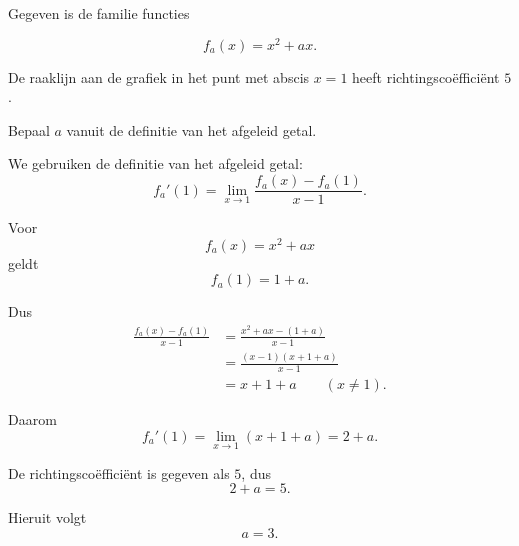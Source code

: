 \documentclass{ximera}
\begin{document}

\begin{oefening}{\oefG}

Gegeven is de familie functies

\[
f_a(x)=x^2+ax.
\]

De raaklijn aan de grafiek in het punt met abscis $x=1$ heeft
richtingscoëfficiënt $5$.

Bepaal $a$ vanuit de definitie van het afgeleid getal.

\begin{oplossing}

We gebruiken de definitie van het afgeleid getal:
\[
f_a'(1)
=
\lim_{x\to1}
\frac{f_a(x)-f_a(1)}{x-1}.
\]

Voor
\[
f_a(x)=x^2+ax
\]
geldt
\[
f_a(1)=1+a.
\]

Dus
\[
\begin{aligned}
\frac{f_a(x)-f_a(1)}{x-1}
&=
\frac{x^2+ax-(1+a)}{x-1}\\
&=
\frac{(x-1)(x+1+a)}{x-1}\\
&=
x+1+a
\qquad (x\neq1).
\end{aligned}
\]

Daarom
\[
f_a'(1)
=
\lim_{x\to1}(x+1+a)
=
2+a.
\]

De richtingscoëfficiënt is gegeven als $5$, dus
\[
2+a=5.
\]

Hieruit volgt
\[
\boxed{a=3}.
\]

\end{oplossing}

\end{oefening}


\end{document}
